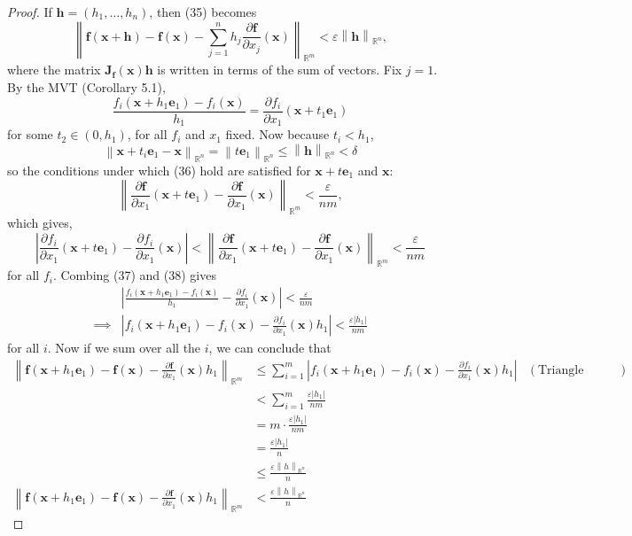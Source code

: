 \documentclass{article}
\newcommand{\R}{\mathbb{R}}
\newcommand{\x}{\mathbf{x}}
\newcommand{\f}{\mathbf{f}}
\newcommand{\h}{\mathbf{h}}
\newcommand{\norm}[1]{\left\lVert#1\right\rVert}
\theoremstyle{definition}
\begin{document}
\begin{proof}
If $ \h = (h_1,\ldots, h_n) $, then (35) becomes 
$$ \norm{\f(\x+\h) - \f(\x)-\sum_{j=1}^nh_j\frac{\partial \f}{\partial x_j}(\x)}_{\R^m} < \varepsilon\norm{\mathbf h}_{\R^n},$$ where the matrix $ \mathbf{J}_\f(\x) \mathbf{h} $ is written in terms of the sum of vectors. Fix $ j=1 $. By the MVT (Corollary 5.1), \begin{equation}\label{key}
	 \frac{f_i(\x + h_1\mathbf e_1) - f_i(\x)}{h_1} = \frac{\partial f_i}{\partial x_1}(\x + t_1\mathbf e_1)
\end{equation}for some $ t_2 \in (0,h_1) $, for all $ f_i $ and $ x_1 $ fixed. Now because $ t_i < h_1 $,
$$\norm{\x + t_i\mathbf e_1 -  \x}_{\R^n} = \norm{t\mathbf e_1}_{\R^n} \le \norm{\mathbf h}_{\R^n} <\delta  $$
so the conditions under which (36) hold are satisfied for $ \x + t\mathbf e_1 $ and $  \x $:
\begin{equation*}\label{key}
\norm{ \frac{\partial \f}{\partial x_1}(\x + t\mathbf e_1 ) - \frac{\partial \f}{\partial x_1}(\x) }_{\R^m} < \frac{\varepsilon}{nm},
\end{equation*}
which gives,
\begin{equation}\label{key}
\left\lvert \frac{\partial f_i}{\partial x_1}(\x + t\mathbf e_1 ) - \frac{\partial f_i}{\partial x_1}(\x) \right\rvert<\norm{ \frac{\partial \f}{\partial x_1}(\x + t\mathbf e_1 ) - \frac{\partial \f}{\partial x_1}(\x) }_{\R^m} < \frac{\varepsilon}{nm}
\end{equation}
for all $ f_i $. Combing (37) and (38) gives
\begin{align*}
&	\left\lvert \frac{f_i(\x + h_1\mathbf e_1) - f_i(\x)}{h_1}  - \frac{\partial f_i}{\partial x_1}(\x) \right\rvert < \frac{\varepsilon}{nm}\\
\implies&  \left\lvert f_i(\x + h_1\mathbf e_1) - f_i(\x) - \frac{\partial f_i}{\partial x_1}(\x)h_1 \right\rvert < \frac{\varepsilon|h_1|}{nm}
\end{align*}
for all $ i $. Now if we sum over all the $ i $, we can conclude that 
\begin{align}
\norm{\f(\x + h_1\mathbf e_1) - \f(\x) - \frac{\partial \f}{\partial x_1}(\x)h_1}_{\R^m} & \le \sum_{i=1}^m  \left\lvert f_i(\x + h_1\mathbf e_1) - f_i(\x) - \frac{\partial f_i}{\partial x_1}(\x)h_1 \right\rvert  & (\text{Triangle Inequality, Definition 8.2})\nonumber\\ & < \sum_{i=1}^m \frac{\varepsilon|h_1|}{nm}\nonumber\\ & = m \cdot \frac{\varepsilon|h_1|}{nm}\nonumber \\ & = \frac{\varepsilon|h_1|}{n}\nonumber\\ & \le \frac{\varepsilon\norm{h}_{\R^n}}{n}\nonumber\\
\norm{\f(\x + h_1\mathbf e_1) - \f(\x) - \frac{\partial \f}{\partial x_1}(\x)h_1}_{\R^m} &< \frac{\varepsilon\norm{h}_{\R^n}}{n} 
\end{align}


\end{proof}
\end{document}
